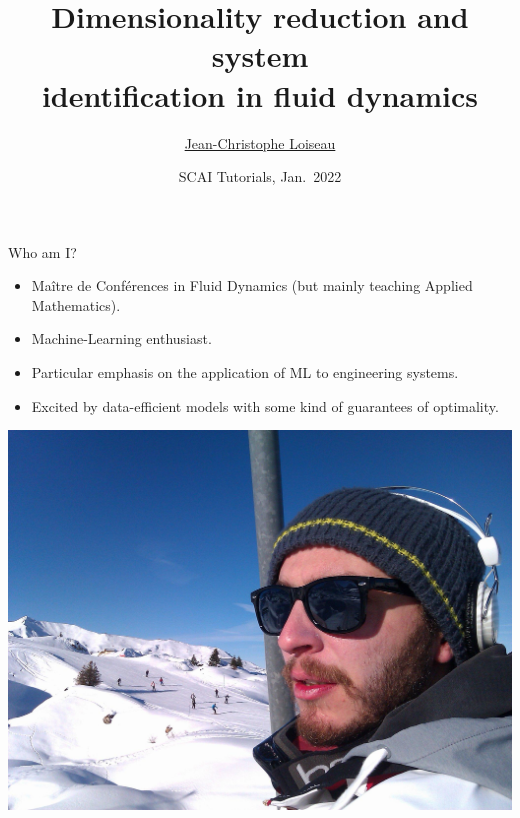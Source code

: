 \documentclass[usenames,dvipsnames,svgnames,10pt,aspectratio=169]{beamer}
\title[Machine learning for reduced-order modeling] %
{
	Dimensionality reduction and system\\
	identification in fluid dynamics
}
\author[J.-Ch.~Loiseau] %
{
	\underline{Jean-Christophe Loiseau}
}
\institute[unused]
{
	DynFluid, Arts \& M\'etiers
}
\date[unused]{SCAI Tutorials, Jan.\ 2022}
\begin{document}
\titleframe


\begin{frame}[t, c]{Who am I?}{}
  \begin{minipage}{.68\textwidth}
    \begin{itemize}
    \item Ma\^itre de Conférences in Fluid Dynamics (but mainly teaching Applied Mathematics).

      \medskip

    \item Machine-Learning enthusiast.

      \medskip
      
    \item Particular emphasis on the application of ML to engineering systems.
 
      \medskip
 
    \item Excited by data-efficient models with some kind of guarantees of optimality.
    \end{itemize}
  \end{minipage}%
  \hfill
  \begin{minipage}{.28\textwidth}
    \centering
    \includegraphics[width=\textwidth]{myself}
  \end{minipage}

  \vspace{1cm}
\end{frame}

\end{document}
